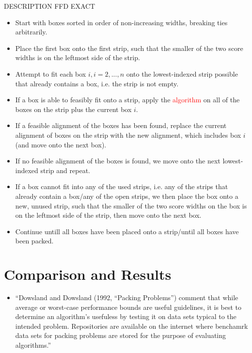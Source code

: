 \documentclass[oribibl]{llncs}
\begin{document}
DESCRIPTION FFD EXACT
\begin{itemize}
	\item Start with boxes sorted in order of non-increasing widths, breaking ties arbitrarily.
	\item Place the first box onto the first strip, such that the smaller of the two score widths is on the leftmost side of the strip.
	\item Attempt to fit each box $i, i = 2,..., n$ onto the lowest-indexed strip possible that already contains a box, i.e. the strip is not empty.
	\item If a box is able to feasibly fit onto a strip, apply the \textcolor{red}{algorithm} on all of the boxes on the strip plus the current box $i$.
	\item If a feasible alignment of the boxes has been found, replace the current alignment of boxes on the strip with the new alignment, which includes box $i$ (and move onto the next box).
	\item If no feasible alignment of the boxes is found, we move onto the next lowest-indexed strip and repeat.
	\item If a box cannot fit into any of the used strips, i.e. any of the strips that already contain a box/any of the open strips, we then place the box onto a new, unused strip, such that the smaller of the two score widths on the box is on the leftmost side of the strip, then move onto the next box.
	\item Continue untill all boxes have been placed onto a strip/until all boxes have been packed.
\end{itemize}





\section{Comparison and Results}
\label{sec:compresult}

\begin{itemize}
	\item ``Dowsland and Dowsland (1992, ``Packing Problems'') comment that while average or worst-case performance bounds are useful guidelines, it is best to determine an algorithm's usefuless by testing it on data sets typical to the intended problem. Repositories are available on the internet where benchamrk data sets for packing problems are stored for the purpose of evaluating algorithms.''
\end{itemize}
\end{document}
